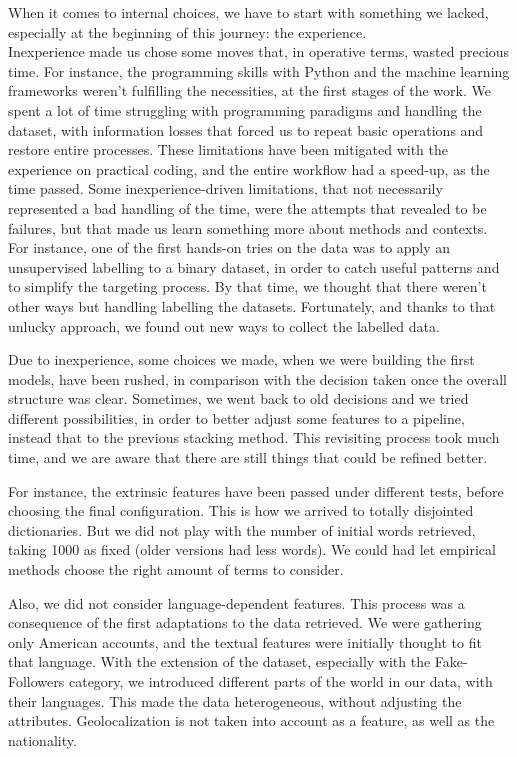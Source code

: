 When it comes to internal choices, we have to start with something we lacked, especially at the beginning of this journey: the experience.\\
Inexperience made us chose some moves that, in operative terms, wasted precious time.
For instance, the programming skills with Python and the machine learning frameworks weren't fulfilling the necessities, at the first stages of the work.
We spent a lot of time struggling with programming paradigms and handling the dataset, with information losses that forced us to repeat basic operations and restore entire processes.
These limitations have been mitigated with the experience on practical coding, and the entire workflow had a speed-up, as the time passed.
Some inexperience-driven limitations, that not necessarily represented a bad handling of the time, were the attempts that revealed to be failures, but that made us learn something more about methods and contexts.
For instance, one of the first hands-on tries on the data was to apply an unsupervised labelling to a binary dataset, in order to catch useful patterns and to simplify the targeting process. By that time, we thought that there weren't other ways but handling labelling the datasets. Fortunately, and thanks to that unlucky approach, we found out new ways to collect the labelled data.

Due to inexperience, some choices we made, when we were building the first models, have been rushed, in comparison with the decision taken once the overall structure was clear. Sometimes, we went back to old decisions and we tried different possibilities, in order to better adjust some features to a pipeline, instead that to the previous stacking method. This revisiting process took much time, and we are aware that there are still things that could be refined better.

For instance, the extrinsic features have been passed under different tests, before choosing the final configuration. This is how we arrived to totally disjointed dictionaries. But we did not play with the number of initial words retrieved, taking 1000 as fixed (older versions had less words). We could had let empirical methods choose the right amount of terms to consider.

Also, we did not consider language-dependent features. This process was a consequence of the first adaptations to the data retrieved. We were gathering only American accounts, and the textual features were initially thought to fit that language.
With the extension of the dataset, especially with the Fake-Followers category, we introduced different parts of the world in our data, with their languages. This made the data heterogeneous, without adjusting the attributes. Geolocalization is not taken into account as a feature, as well as the nationality. 

